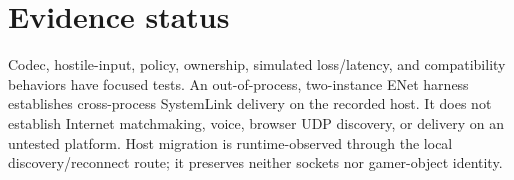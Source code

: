 \section{Evidence status}

Codec, hostile-input, policy, ownership, simulated loss/latency, and compatibility behaviors
have focused tests. An out-of-process, two-instance ENet harness establishes cross-process
SystemLink delivery on the recorded host. It does not establish Internet matchmaking, voice,
browser UDP discovery, or delivery on an untested platform. Host migration is runtime-observed
through the local discovery/reconnect route; it preserves neither sockets nor gamer-object
identity.
